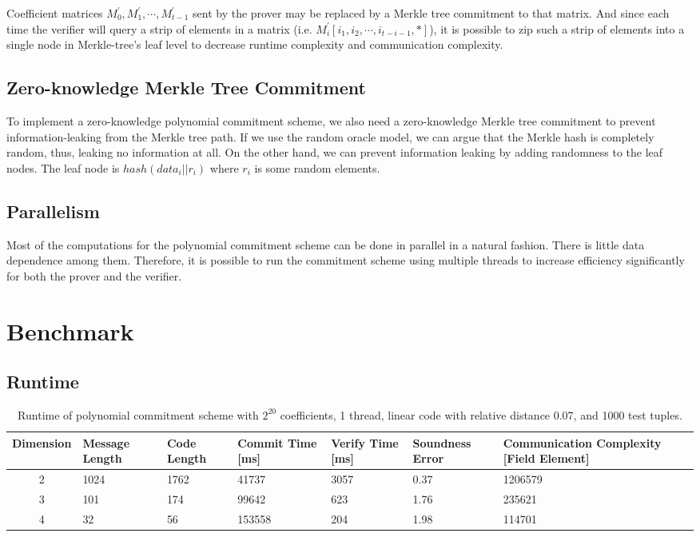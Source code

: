 Coefficient matrices $M_0^\prime, M_1^\prime, \cdots, M_{t-1}^\prime$ sent by the prover may be replaced by a Merkle tree commitment to that matrix. And since each time the verifier will query a strip of elements in a matrix (i.e. $M_i^\prime[i_1, i_2, \cdots, i_{t-i-1}, *]$), it is possible to zip such a strip of elements into a single node in Merkle-tree's leaf level to decrease runtime complexity and communication complexity.

\subsection{Zero-knowledge Merkle Tree Commitment}

To implement a zero-knowledge polynomial commitment scheme, we also need a zero-knowledge Merkle tree commitment to prevent information-leaking from the Merkle tree path. If we use the random oracle model, we can argue that the Merkle hash is completely random, thus, leaking no information at all. On the other hand, we can prevent information leaking by adding randomness to the leaf nodes. The leaf node is $hash(data_i || r_i)$ where $r_i$ is some random elements. 

\subsection{Parallelism}

Most of the computations for the polynomial commitment scheme can be done in parallel in a natural fashion. There is little data dependence among them. Therefore, it is possible to run the commitment scheme using multiple threads to increase efficiency significantly for both the prover and the verifier.



\section{Benchmark}

\subsection{Runtime}


\begin{table}[h!]
\centering
\begin{tabular}{| c | m{4em}  | m{3em}  | m{3.5em} | m{2.5em} | m{5em} | m{7em} |} 
 \hline
 Dimension & Message Length & Code Length & Commit Time [ms] & Verify Time [ms] & Soundness Error & Communication Complexity [Field Element] \\ [0.5ex] 
 \hline\hline
 2 & 1024   & 1762 & 41737  & 3057  & 0.37 & 1206579 \\
 \hline
 3 & 101    & 174 & 99642  & 623  & 1.76 & 235621  \\
 \hline
 4 & 32     & 56 & 153558  & 204  & 1.98 & 114701   \\
 \hline
\end{tabular}
\caption{Runtime of polynomial commitment scheme with $2^{20}$ coefficients, 1 thread, linear code with relative distance 0.07, and 1000 test tuples.}
\label{table:benchmark-pc-1}
\end{table}


